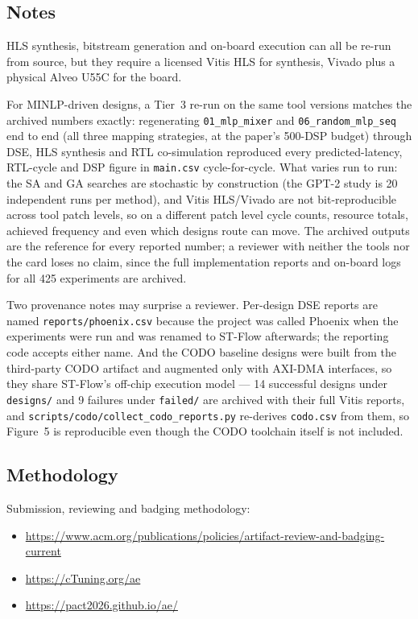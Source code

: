 \subsection{Notes}

HLS synthesis, bitstream generation and on-board execution can all be re-run from
source, but they require a licensed Vitis HLS for synthesis, Vivado plus a physical Alveo U55C for the
board.

For MINLP-driven designs, a Tier~3 re-run on the same tool versions matches the archived
numbers exactly: regenerating \texttt{01\_mlp\_mixer} and \texttt{06\_random\_mlp\_seq}
end to end (all three mapping strategies, at the paper's 500-DSP budget) through DSE,
HLS synthesis and RTL co-simulation reproduced every predicted-latency, RTL-cycle and DSP
figure in \texttt{main.csv} cycle-for-cycle. What varies run to run: the SA and GA
searches are stochastic by construction (the GPT-2 study is 20 independent runs per
method), and Vitis HLS/Vivado are not bit-reproducible across tool patch levels, so on a
different patch level cycle counts, resource totals, achieved frequency and even which
designs route can move. The archived outputs are the reference for every reported
number; a reviewer with neither the tools nor the card loses no claim, since the full
implementation reports and on-board logs for all 425 experiments are archived.

Two provenance notes may surprise a reviewer. Per-design DSE reports are named
\texttt{reports/phoenix.csv} because the project was called Phoenix when the experiments
were run and was renamed to ST-Flow afterwards; the reporting code accepts either name.
And the CODO baseline designs were built from the third-party CODO artifact and
augmented only with AXI-DMA interfaces, so they share ST-Flow's off-chip execution
model --- 14 successful designs under \texttt{designs/} and 9 failures under
\texttt{failed/} are archived with their full Vitis reports, and
\texttt{scripts/codo/collect\_codo\_reports.py} re-derives \texttt{codo.csv} from them,
so Figure~5 is reproducible even though the CODO toolchain itself is not included.

\subsection{Methodology}

Submission, reviewing and badging methodology:
\begin{itemize}
  \item \url{https://www.acm.org/publications/policies/artifact-review-and-badging-current}
  \item \url{https://cTuning.org/ae}
  \item \url{https://pact2026.github.io/ae/}
\end{itemize}
